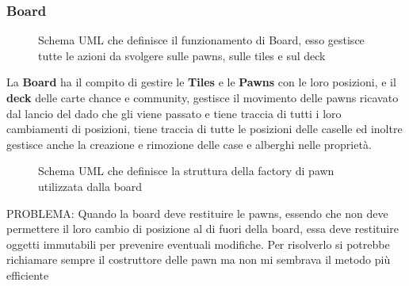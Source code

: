 \subsubsection{Board}
\begin{figure}[H]
    \centering
    \caption{Schema UML che definisce il funzionamento di Board, esso gestisce tutte le azioni da svolgere sulle pawns, sulle tiles e sul deck}
	\label{img:Board}
\end{figure}
La \textbf{Board} ha il compito di gestire le \textbf{Tiles} e le \textbf{Pawns} con le loro posizioni, e il \textbf{deck} delle carte chance e community, 
gestisce il movimento delle pawns ricavato dal lancio del dado che gli viene passato e tiene traccia di tutti i loro cambiamenti di posizioni,
tiene traccia di tutte le posizioni delle caselle ed inoltre gestisce anche la creazione e rimozione delle case e alberghi nelle proprietà.\newline
\begin{figure}[H]
    \centering
    \caption{Schema UML che definisce la struttura della factory di pawn utilizzata dalla board}
	\label{img:Pawns}
\end{figure}
PROBLEMA:
Quando la board deve restituire le pawns, essendo che non deve permettere il loro cambio di posizione al di fuori della board, 
essa deve restituire oggetti immutabili per prevenire eventuali modifiche. 
Per risolverlo si potrebbe richiamare sempre il costruttore delle pawn ma non mi sembrava il metodo più efficiente \newline


